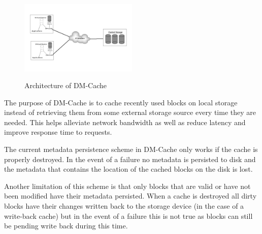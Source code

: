 \graphicspath{{../Images/}}

\begin{figure}[t]
  \caption{Architecture of DM-Cache}
  \centering \includegraphics[width=0.5\textwidth]{dm-cache_diagram.jpg}
  \label{fig:dm-cache}
\end{figure}

The purpose of DM-Cache is to cache recently used blocks on local
storage instead of retrieving them from some external storage source
every time they are needed. This helps alleviate network bandwidth as
well as reduce latency and improve response time to requests.

The current metadata persistence scheme in DM-Cache only works if the
cache is properly destroyed. In the event of a failure no metadata is
persisted to disk and the metadata that contains the location of the
cached blocks on the disk is lost.

Another limitation of this scheme is that only blocks that are valid
or have not been modified have their metadata persisted. When a cache
is destroyed all dirty blocks have their changes written back to the
storage device (in the case of a write-back cache) but in the event of
a failure this is not true as blocks can still be pending write back
during this time.
